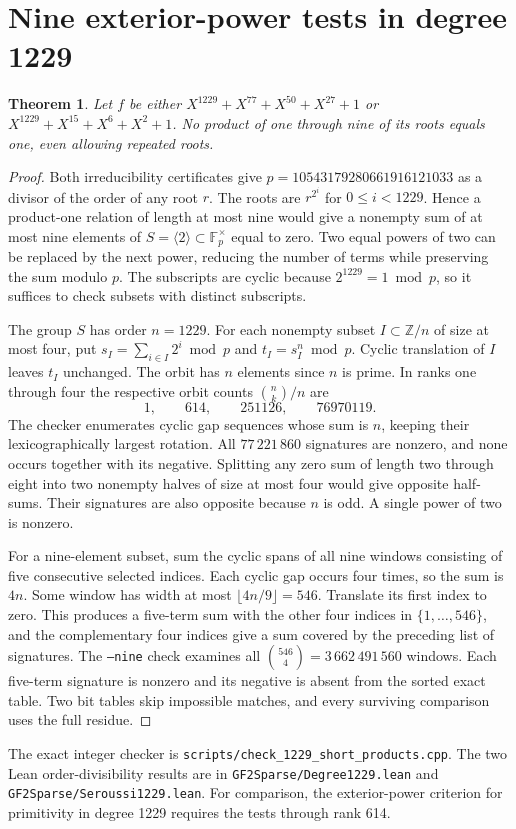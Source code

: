 \documentclass[11pt]{article}
\newtheorem{theorem}{Theorem}
\begin{document}
\section{Nine exterior-power tests in degree 1229}
\begin{theorem}\label{thm:1229-short-tests}
Let \(f\) be either \(X^{1229}+X^{77}+X^{50}+X^{27}+1\) or
\(X^{1229}+X^{15}+X^6+X^2+1\). No product of one through nine of
its roots equals one, even allowing repeated roots.
\end{theorem}
\begin{proof}
Both irreducibility certificates give \(p=10543179280661916121033\)
as a divisor of the order of any root \(r\). The roots are \(r^{2^i}\)
for \(0\le i<1229\). Hence a product-one relation of length at most
nine would give a nonempty sum of at most nine elements of
\(S=\langle2\rangle\subset\mathbb F_p^\times\) equal to zero.
Two equal powers of two can be replaced by the next power, reducing
the number of terms while preserving the sum modulo \(p\). The
subscripts are cyclic because \(2^{1229}=1\bmod p\), so it suffices
to check subsets with distinct subscripts.

The group \(S\) has order \(n=1229\). For each nonempty subset
\(I\subset\mathbb Z/n\) of size at most four, put
\(s_I=\sum_{i\in I}2^i\bmod p\) and \(t_I=s_I^n\bmod p\).
Cyclic translation of \(I\) leaves \(t_I\) unchanged. The orbit
has \(n\) elements since \(n\) is prime. In ranks one through four the
respective orbit counts \(\binom{n}{k}/n\) are
\[
      1,\qquad 614,\qquad 251126,\qquad 76970119.
\]
The checker enumerates cyclic gap sequences whose sum is \(n\), keeping
their lexicographically largest rotation. All \(77\,221\,860\) signatures
are nonzero, and none occurs together with its negative.
Splitting any zero sum of length two through eight into two nonempty
halves of size at most four would give opposite half-sums. Their
signatures are also opposite because \(n\) is odd. A single power of
two is nonzero.

For a nine-element subset, sum the cyclic spans of all nine windows
consisting of five consecutive selected indices. Each cyclic gap occurs
four times, so the sum is \(4n\). Some window has width at most
\(\lfloor4n/9\rfloor=546\). Translate its first index to zero.
This produces a five-term sum with the other four indices in
\(\{1,\ldots,546\}\), and the complementary four indices give a sum
covered by the preceding list of signatures. The \texttt{--nine} check
examines all \(\binom{546}{4}=3\,662\,491\,560\) windows.
Each five-term signature is nonzero and its negative is absent from
the sorted exact table. Two bit tables skip impossible matches, and
every surviving comparison uses the full residue.
\end{proof}
The exact integer checker is \nolinkurl{scripts/check_1229_short_products.cpp}.
The two Lean order-divisibility results are in
\nolinkurl{GF2Sparse/Degree1229.lean} and \nolinkurl{GF2Sparse/Seroussi1229.lean}.
For comparison, the exterior-power criterion for primitivity in degree
1229 requires the tests through rank 614.
\end{document}

